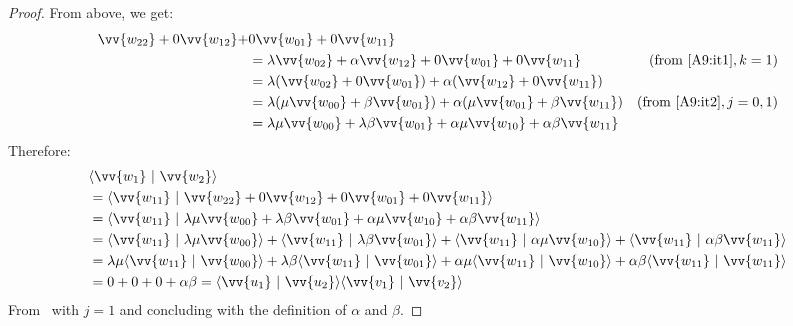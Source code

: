 \documentclass[runningheads,orivec,envcountsame,envcountsect]{llncs}
\def\scal#1#2{\langle{#1}~|~{#2}\rangle}
\begin{document}
\begin{lemma}
\begin{proof}
    From above, we get:
    \begin{align*}
        \vv{w_{22}} + 0\vv{w_{12}} + &0\vv{w_{01}} + 0\vv{w_{11}} \\
        &= \lambda\vv{w_{02}} + \alpha\vv{w_{12}} + 0\vv{w_{01}} + 0\vv{w_{11}} & (\text{from~\Cref{A9:it1}}, k =1)\\
        &= \lambda(\vv{w_{02}}+0\vv{w_{01}}) + \alpha(\vv{w_{12}}+0\vv{w_{11}})&\\
        &= \lambda(\mu\vv{w_{00}} + \beta\vv{w_{01}}) + \alpha(\mu\vv{w_{01}}+\beta\vv{w_{11}}) & (\text{from~\Cref{A9:it2}}, j=0,1)\\
        &= \lambda\mu\vv{w_{00}} + \lambda\beta\vv{w_{01}} + \alpha\mu\vv{w_{10}} + \alpha\beta\vv{w_{11}}
    \end{align*}
    Therefore:
    \begin{align*}
        &\scal{\vv{w_1}}{\vv{w_2}} \\
        &= \scal{\vv{w_{11}}}{\vv{w_{22}} + 0 \vv{w_{12}} + 0 \vv{w_{01}} + 0 \vv{w_{11}}}\\
        &= \scal{\vv{w_{11}}}{\lambda\mu\vv{w_{00}} + \lambda\beta\vv{w_{01}} + \alpha\mu\vv{w_{10}} + \alpha\beta\vv{w_{11}}}\\
        &=\scal{\vv{w_{11}}}{\lambda\mu\vv{w_{00}}} + \scal{\vv{w_{11}}}{\lambda\beta\vv{w_{01}}} + \scal{\vv{w_{11}}}{\alpha\mu\vv{w_{10}}} + \scal{\vv{w_{11}}}{\alpha\beta\vv{w_{11}}}\\
        &=\lambda\mu\scal{\vv{w_{11}}}{\vv{w_{00}}} + \lambda\beta\scal{\vv{w_{11}}}{\vv{w_{01}}} + \alpha\mu\scal{\vv{w_{11}}}{\vv{w_{10}}} + \alpha\beta\scal{\vv{w_{11}}}{\vv{w_{11}}}\\
        &= 0 + 0 + 0 + \alpha\beta = \scal{\vv{u_1}}{\vv{u_2}}\scal{\vv{v_1}}{\vv{v_2}}
    \end{align*}
    From~ with $j=1$ and concluding with the definition of $\alpha$ and $\beta$.
\end{proof}
\end{lemma}
\end{document}

